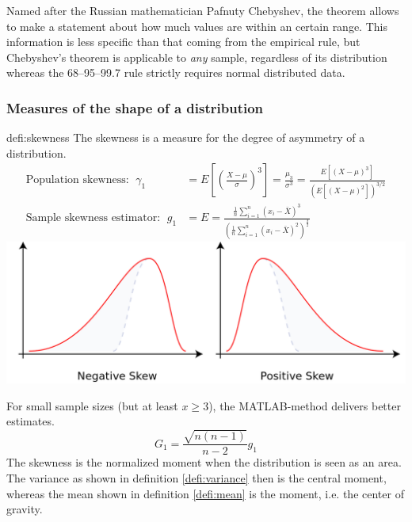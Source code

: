 		Named after the Russian mathematician Pafnuty Chebyshev, the theorem allows to make a statement about how much values are within an certain range. This information is less specific than that coming from the empirical rule, but Chebyshev's theorem is applicable to \emph{any} sample, regardless of its distribution whereas the 68–95–99.7 rule strictly requires normal distributed data.
	\subsubsection{Measures of the shape of a distribution}
		\begin{defi}[Skewness]{defi:skewness}
			The skewness is a measure for the degree of asymmetry of a distribution.
			\begin{align*}
				\text{Population skewness: }\;\gamma_1&={E}\left[\left(\frac{X-\mu}{\sigma}\right)^3 \right]= \frac{\mu_3}{\sigma^3}= \frac{E\left[(X-\mu)^3\right]}{( E\left[ (X-\mu)^2 \right] )^{3/2}}\\
				\text{Sample skewness estimator: }\; g_1&={E}=\frac{\frac{1}{n}\sum\limits_{i=1}^n (x_i-\bar{X})^3}{\left(\frac{1}{n}\sum\limits_{i=1}^n (x_i-\bar{X})^2\right)^\frac{3}{2}}
			\end{align*}			
			\includegraphics[width=\textwidth]{P01skew.png}	
		\end{defi}
		For small sample sizes (but at least $x\geq 3$), the MATLAB-method delivers better estimates.
		\begin{equation*}
			G_1=\frac{\sqrt{n(n-1)}}{n-2}g_1
		\end{equation*}
		The skewness is the  normalized moment when the distribution is seen as an area. The variance as shown in definition \ref{defi:variance} then is the  central moment, whereas the mean shown in definition \ref{defi:mean} is the  moment, i.e. the center of gravity.
